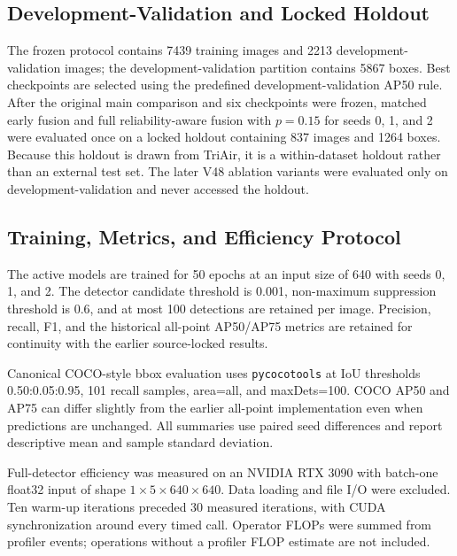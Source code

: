 \subsection{Development-Validation and Locked Holdout}

The frozen protocol contains 7439 training images and 2213 development-validation images; the development-validation partition contains 5867 boxes. Best checkpoints are selected using the predefined development-validation AP50 rule. After the original main comparison and six checkpoints were frozen, matched early fusion and full reliability-aware fusion with $p=0.15$ for seeds 0, 1, and 2 were evaluated once on a locked holdout containing 837 images and 1264 boxes. Because this holdout is drawn from TriAir, it is a within-dataset holdout rather than an external test set. The later V48 ablation variants were evaluated only on development-validation and never accessed the holdout.

\begin{table}[t]
\caption{Dataset inventory and leakage-aware partition documentation.}
\label{tab:dataset-and-clean-blocked-split}
\centering

\end{table}

\subsection{Training, Metrics, and Efficiency Protocol}

The active models are trained for 50 epochs at an input size of 640 with seeds 0, 1, and 2. The detector candidate threshold is 0.001, non-maximum suppression threshold is 0.6, and at most 100 detections are retained per image. Precision, recall, F1, and the historical all-point AP50/AP75 metrics are retained for continuity with the earlier source-locked results.

Canonical COCO-style bbox evaluation uses \texttt{pycocotools} at IoU thresholds 0.50:0.05:0.95, 101 recall samples, area=all, and maxDets=100. COCO AP50 and AP75 can differ slightly from the earlier all-point implementation even when predictions are unchanged. All summaries use paired seed differences and report descriptive mean and sample standard deviation.

Full-detector efficiency was measured on an NVIDIA RTX 3090 with batch-one float32 input of shape $1\times5\times640\times640$. Data loading and file I/O were excluded. Ten warm-up iterations preceded 30 measured iterations, with CUDA synchronization around every timed call. Operator FLOPs were summed from profiler events; operations without a profiler FLOP estimate are not included.

